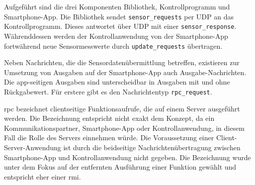\documentclass[11pt,a4paper]{report}
\begin{document}
Aufgeführt sind die drei Komponenten Bibliothek, Kontrollprogramm und Smartphone-App.
Die Bibliothek sendet \texttt{sensor\_requests} per UDP an das Kontrollprogramm.
Dieses antwortet über UDP mit einer \texttt{sensor\_response}.
Währenddessen werden der Kontrollanwendung von der Smartphone-App fortwährend neue Sensormesswerte durch \texttt{update\_requests} übertragen.

Neben Nachrichten, die die Sensordatenübermittlung betreffen, existieren zur Umsetzung von Ausgaben auf der Smartphone-App auch Ausgabe-Nachrichten.
Die app-seitigen Ausgaben sind unterscheidbar in Ausgaben mit und ohne Rückgabewert.
Für erstere gibt es den Nachrichtentyp \texttt{rpc\_request}.

\acrfull{rpc} bezeichnet clientseitige Funktionsaufrufe, die auf einem Server ausgeführt werden.
Die Bezeichnung entspricht nicht exakt dem Konzept, da ein Kommunikationspartner, Smartphone-App oder Kontrollanwendung, in diesem Fall die Rolle des Servers einnehmen würde.
Die Voraussetzung einer Client-Server-Anwendung ist durch die beidseitige Nachrichtenübertragung zwischen Smartphone-App und Kontrollanwendung nicht gegeben.
Die Bezeichnung wurde unter dem Fokus auf der entfernten Ausführung einer Funktion gewählt und entspricht eher einer \acrfull{rmi}.
\end{document}

